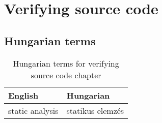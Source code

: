 \chapter{Verifying source code}


\section{Hungarian terms}

\begin{table}[ht]
    \centering
    \small
    \caption{Hungarian terms for verifying source code chapter}
    \begin{tabular}{ll}
        \toprule
        \textbf{English} & \textbf{Hungarian} \\
        \midrule
        static analysis & statikus elemzés \\
        \bottomrule
        \end{tabular}
        \label{tab:overview:hungarian-terms-code}
        \end{table}